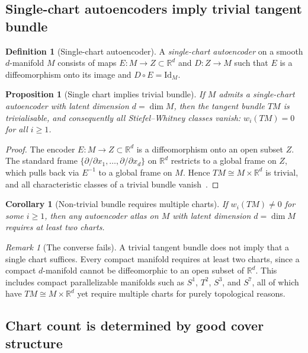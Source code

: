 \documentclass[11pt]{article}
\newcommand{\R}{\mathbb{R}}
\newcommand{\Id}{\mathrm{Id}}
\theoremstyle{plain}
\newtheorem{proposition}[theorem]{Proposition}
\newtheorem{corollary}[theorem]{Corollary}
\theoremstyle{definition}
\newtheorem{definition}[theorem]{Definition}
\theoremstyle{remark}
\newtheorem{remark}[theorem]{Remark}
\begin{document}
\subsection{Single-chart autoencoders imply trivial tangent bundle}

\begin{definition}[Single-chart autoencoder]
A \emph{single-chart autoencoder} on a smooth $d$-manifold $M$ consists of maps $E \colon M \to Z \subset \R^d$ and $D \colon Z \to M$ such that $E$ is a diffeomorphism onto its image and $D \circ E = \Id_M$.
\end{definition}

\begin{proposition}[Single chart implies trivial bundle]\label{prop:single-chart-trivial}
If $M$ admits a single-chart autoencoder with latent dimension $d = \dim M$, then the tangent bundle $TM$ is trivialisable, and consequently all Stiefel--Whitney classes vanish: $w_i(TM) = 0$ for all $i \geq 1$.
\end{proposition}

\begin{proof}
The encoder $E \colon M \to Z \subset \R^d$ is a diffeomorphism onto an open subset $Z$. The standard frame $\{\partial/\partial x_1, \ldots, \partial/\partial x_d\}$ on $\R^d$ restricts to a global frame on $Z$, which pulls back via $E^{-1}$ to a global frame on $M$. Hence $TM \cong M \times \R^d$ is trivial, and all characteristic classes of a trivial bundle vanish~\cite[Lemma~6.8]{Zakharevich2024}.
\end{proof}

\begin{corollary}[Non-trivial bundle requires multiple charts]\label{cor:nontrivial-multiple}
If $w_i(TM) \neq 0$ for some $i \geq 1$, then any autoencoder atlas on $M$ with latent dimension $d = \dim M$ requires at least two charts.
\end{corollary}

\begin{remark}[The converse fails]
A trivial tangent bundle does not imply that a single chart suffices. Every compact manifold requires at least two charts, since a compact $d$-manifold cannot be diffeomorphic to an open subset of $\R^d$. This includes compact parallelizable manifolds such as $S^1$, $T^2$, $S^3$, and $S^7$, all of which have $TM \cong M \times \R^d$ yet require multiple charts for purely topological reasons.
\end{remark}

\subsection{Chart count is determined by good cover structure}
\end{document}

